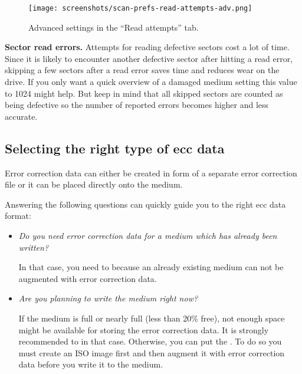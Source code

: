 \newpage
\begin{figure}[h]
\centerline{\texttt{[image: screenshots/scan-prefs-read-attempts-adv.png]}}
\caption{Advanced settings in the ``Read attempts'' tab.}  
\label{howto-scan-prefs-read-attempts-adv}
\end{figure}

{\bf Sector read errors.} \label{howto-scan-advanced-settings-read-attempts} Attempts
for reading defective sectors
cost a lot of time. Since it is likely to encounter another defective
sector after hitting a read error, skipping a few sectors after a
read error saves time and reduces wear on the drive. If you only want
a quick overview of a damaged medium setting this value to 1024 might help.
But keep in mind that all skipped sectors are counted as being defective
so the number of reported errors becomes higher and less accurate.

\newpage
\subsection{Selecting the right type of ecc data}
\label{howto-ecc}

Error correction data can either be created in form of
a separate error correction file or it can be placed directly
onto the medium.

\smallskip

Answering the following questions can quickly guide you to the right
ecc data format:

\begin{itemize}
\item {\em Do you need error correction data for a medium which has already been written?}

  In that case, you need to  because an already existing medium can not be
  augmented with error correction data. 

\item {\em Are you planning to write the medium right now?}

  If the medium is full or nearly full (less than 20\% free),
  not enough space might be available for storing the error
  correction data. It is strongly recommended to  in that case. Otherwise, you can put
  the .
  To do so you must create an ISO image first and then augment it with
  error correction data before you write it to the medium. 
\end{itemize}

